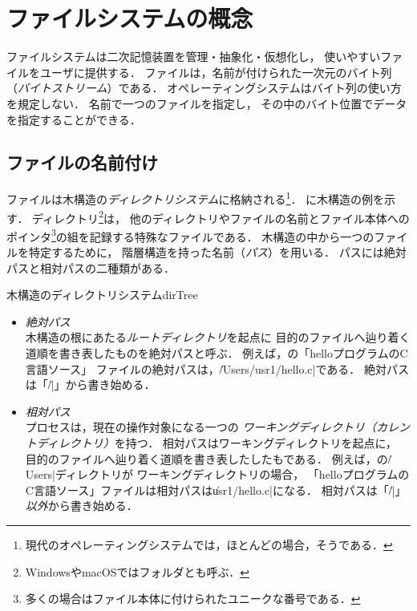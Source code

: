 \chapter{ファイルシステムの概念}
\label{fileSystemConcepts}
ファイルシステムは二次記憶装置を管理・抽象化・仮想化し，
使いやすいファイルをユーザに提供する．
ファイルは，名前が付けられた一次元のバイト列（\emph{バイトストリーム}）である．
オペレーティングシステムはバイト列の使い方を規定しない．
名前で一つのファイルを指定し，
その中のバイト位置でデータを指定することができる．


\section{ファイルの名前付け}
ファイルは木構造の\emph{ディレクトリシステム}に格納される\footnote{
現代のオペレーティングシステムでは，ほとんどの場合，そうである．}．
に木構造の例を示す．
ディレクトリ\footnote{WindowsやmacOSではフォルダとも呼ぶ．}は，
他のディレクトリやファイルの名前とファイル本体へのポインタ\footnote{
  多くの場合はファイル本体に付けられたユニークな番号である．
}の組を記録する特殊なファイルである．
木構造の中から一つのファイルを特定するために，
階層構造を持った名前（\emph{パス}）を用いる．
パスには絶対パスと相対パスの二種類がある．

         {木構造のディレクトリシステム}{dirTree}

\begin{itemize}
\item \emph{絶対パス} \\
  木構造の根にあたる\emph{ルートディレクトリ}を起点に
  目的のファイルへ辿り着く道順を書き表したものを絶対パスと呼ぶ．
  例えば，の「helloプログラムのC言語ソース」
  ファイルの絶対パスは，\|/Users/usr1/hello.c|である．
  絶対パスは「\|/|」から書き始める．

\item \emph{相対パス} \\
  プロセスは，現在の操作対象になる一つの
  \emph{ワーキングディレクトリ（カレントディレクトリ）}を持つ．
  相対パスはワーキングディレクトリを起点に，
  目的のファイルへ辿り着く道順を書き表したしたもである．
  例えば，の\|/Users|ディレクトリが
  ワーキングディレクトリの場合，
  「helloプログラムのC言語ソース」ファイルは相対パスは\|usr1/hello.c|になる．
  相対パスは「\|/|」\emph{以外}から書き始める．
\end{itemize}

